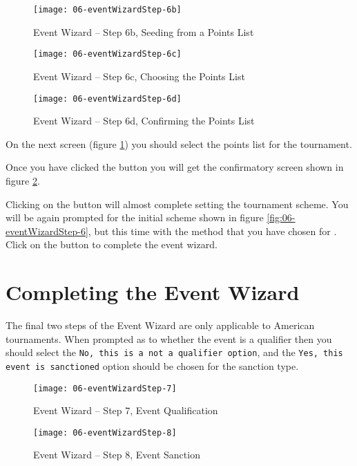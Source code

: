 \documentclass[a4paper,11pt]{memoir}
\begin{document}
\begin{figure}[!ht]
 \centering
 \begin{minipage}{0.4\textwidth}
  \centering
  \texttt{[image: 06-eventWizardStep-6b]}
  \caption{Event Wizard -- Step 6b, Seeding from a Points List} \label{fig:06-eventWizardStep-6b}
 \end{minipage}
 \hfill
 \begin{minipage}{0.4\textwidth}
  \centering
  \texttt{[image: 06-eventWizardStep-6c]}
  \caption{Event Wizard -- Step 6c, Choosing the Points List} \label{fig:06-eventWizardStep-6c}
 \end{minipage}
\end{figure}

\begin{figure}[!ht]
 \centering
 \texttt{[image: 06-eventWizardStep-6d]}
 \caption{Event Wizard -- Step 6d, Confirming the Points List} \label{fig:06-eventWizardStep-6d}
\end{figure}

On the next screen (figure \ref{fig:06-eventWizardStep-6c}) you should select the points list for the tournament.

Once you have clicked the  button you will get the confirmatory screen shown in figure \ref{fig:06-eventWizardStep-6d}.

Clicking on the  button will almost complete setting the tournament  scheme. You will be again prompted for the initial  scheme shown in figure \ref{fig:06-eventWizardStep-6}, but this time with the method that you have chosen for . Click on the  button to complete the event wizard.

\section{Completing the Event Wizard}

The final two steps of the Event Wizard are only applicable to American tournaments. When prompted as to whether the event is a qualifier then you should select the \texttt{No, this is a not a qualifier option}, and the \texttt{Yes, this event is sanctioned} option should be chosen for the sanction type.

\begin{figure}[!ht]
 \centering
 \begin{minipage}{0.4\textwidth}
  \centering
  \texttt{[image: 06-eventWizardStep-7]}
  \caption{Event Wizard -- Step 7, Event Qualification} \label{fig:06-eventWizardStep-7}
 \end{minipage}
 \hfill
 \begin{minipage}{0.4\textwidth}
  \centering
  \texttt{[image: 06-eventWizardStep-8]}
  \caption{Event Wizard -- Step 8, Event Sanction} \label{fig:06-eventWizardStep-8}
 \end{minipage}
\end{figure}
\end{document}

